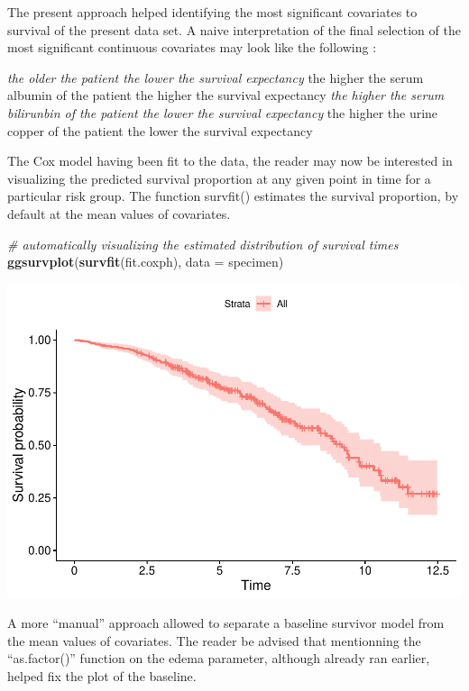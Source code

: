 \documentclass[]{article}
\newenvironment{Shaded}{\begin{snugshade}}{\end{snugshade}}
\newcommand{\KeywordTok}[1]{\textcolor[rgb]{0.13,0.29,0.53}{\textbf{#1}}}
\newcommand{\DataTypeTok}[1]{\textcolor[rgb]{0.13,0.29,0.53}{#1}}
\newcommand{\CommentTok}[1]{\textcolor[rgb]{0.56,0.35,0.01}{\textit{#1}}}
\newcommand{\NormalTok}[1]{#1}
\begin{document}
The present approach helped identifying the most significant covariates
to survival of the present data set. A naive interpretation of the final
selection of the most significant continuous covariates may look like
the following :

\emph{the older the patient the lower the survival expectancy }the
higher the serum albumin of the patient the higher the survival
expectancy \emph{the higher the serum bilirunbin of the patient the
lower the survival expectancy }the higher the urine copper of the
patient the lower the survival expectancy

The Cox model having been fit to the data, the reader may now be
interested in visualizing the predicted survival proportion at any given
point in time for a particular risk group. The function survfit()
estimates the survival proportion, by default at the mean values of
covariates.

\begin{Shaded}
\begin{Highlighting}[]
\CommentTok{# automatically visualizing the estimated distribution of survival times}
\KeywordTok{ggsurvplot}\NormalTok{(}\KeywordTok{survfit}\NormalTok{(fit.coxph), }\DataTypeTok{data =}\NormalTok{ specimen)}
\end{Highlighting}
\end{Shaded}

\includegraphics{report_files/figure-latex/unnamed-chunk-20-1.pdf}

A more ``manual'' approach allowed to separate a baseline survivor model
from the mean values of covariates. The reader be advised that
mentionning the ``as.factor()'' function on the edema parameter,
although already ran earlier, helped fix the plot of the baseline.
\end{document}
